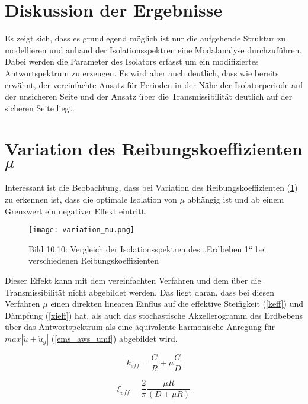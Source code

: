 \section{Diskussion der Ergebnisse}
\label{sec:diskussion}

Es zeigt sich, dass es grundlegend möglich ist nur die aufgehende Struktur zu modellieren und anhand der Isolationsspektren eine Modalanalyse durchzuführen.
Dabei werden die Parameter des Isolators erfasst um ein modifiziertes Antwortspektrum zu erzeugen.
Es wird aber auch deutlich, dass wie bereits erwähnt, der vereinfachte Ansatz für Perioden in der Nähe der Isolatorperiode auf der unsicheren Seite und der Ansatz über die Transmissibilität deutlich auf der sicheren Seite liegt.

\section{Variation des Reibungskoeffizienten $\mu$}
\label{sec:muvariation}

Interessant ist die Beobachtung, dass bei Variation des Reibungskoeffizienten (\cref{fig:muvariation}) zu erkennen ist, dass die optimale Isolation von $\mu$ abhängig ist und ab einem Grenzwert ein negativer Effekt eintritt.

\begin{figure}[H]
    \centering
    \texttt{[image: variation\_mu.png]}
    \caption{Bild 10.10: Vergleich der Isolationsspektren des „Erdbeben 1“ bei verschiedenen Reibungskoeffizienten \cite{Isemann}}
    \label{fig:muvariation}
\end{figure}

Dieser Effekt kann mit dem vereinfachten Verfahren und dem über die Transmissibilität nicht abgebildet werden. Das liegt daran, dass bei diesen Verfahren $\mu$ einen direkten linearen Einflus auf die effektive Steifigkeit (\cref{keff}) und Dämpfung (\cref{xieff}) hat, als auch das stochastische Akzellerogramm des Erdbebens über das Antwortspektrum als eine äquivalente harmonische Anregung für $max|\ddot u + \ddot u_g|$ (\cref{ems_aws_umf}) abgebildet wird.

\begin{equation*}
k_{eff} = \frac{G}{R} + \mu \frac{G}{D}
\end{equation*}

\begin{equation*}
\xi_{eff} = \frac{2}{\pi} \frac{\mu R}{(D + \mu R)}
\end{equation*}

